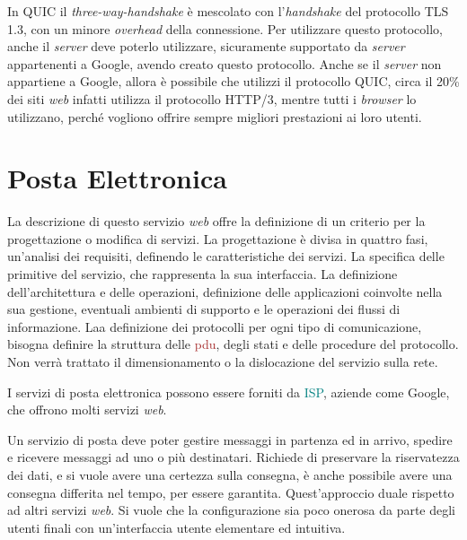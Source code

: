 \documentclass{article}
\numberwithin{equation}{subsection}
\begin{document}
In QUIC il \textit{three-way-handshake} è mescolato con l'\textit{handshake} del protocollo TLS 1.3, con un minore \textit{overhead} della connessione. Per utilizzare questo protocollo, 
anche il \textit{server} deve poterlo utilizzare, sicuramente supportato da \textit{server} appartenenti a Google, avendo creato questo protocollo. Anche se il 
\textit{server} non appartiene a Google, allora è possibile che utilizzi il protocollo QUIC, circa il 20\% dei siti \textit{web} infatti utilizza il protocollo \textcolor{NavyBlue}{HTTP}/3, mentre tutti i 
\textit{browser} lo utilizzano, perché vogliono offrire sempre migliori prestazioni ai loro utenti. 

\clearpage

\section{Posta Elettronica}

La descrizione di questo servizio \textit{web} offre la definizione di un criterio per la progettazione o modifica di servizi. 
La progettazione è divisa in quattro fasi, un'analisi dei requisiti, definendo le caratteristiche dei servizi. La specifica delle primitive del servizio, che rappresenta la sua interfaccia. La definizione dell'architettura e delle operazioni, definizione delle applicazioni coinvolte nella sua gestione, eventuali ambienti di supporto e le operazioni dei flussi di informazione. Laa definizione dei protocolli per ogni tipo di comunicazione, bisogna definire la struttura delle \textcolor{Brown}{pdu}, degli stati e delle procedure del protocollo. Non verrà trattato il dimensionamento o la dislocazione del servizio sulla rete. 

I servizi di posta elettronica possono essere forniti da \textcolor{teal}{ISP}, aziende come Google, che offrono molti servizi \textit{web}. 


Un servizio di posta deve poter gestire messaggi in partenza ed in arrivo, spedire e ricevere messaggi ad uno o più 
destinatari. Richiede di preservare la riservatezza dei dati, e si vuole avere una certezza sulla consegna, è anche possibile avere una consegna 
differita nel tempo, per essere garantita. Quest'approccio duale rispetto ad altri servizi \textit{web}. 
Si vuole che la configurazione sia poco onerosa da parte degli utenti finali con un'interfaccia utente 
elementare ed intuitiva. 
\end{document}
